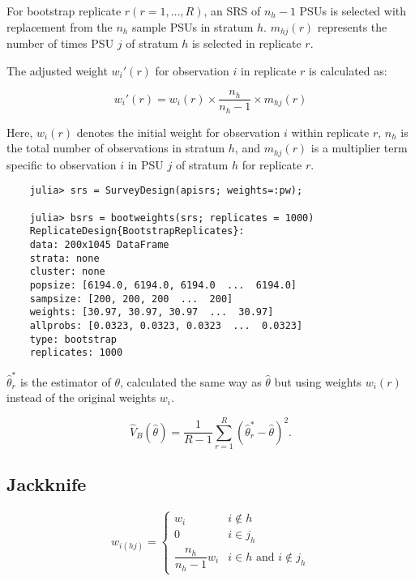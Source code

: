 \documentclass{juliacon}
\begin{document}
For bootstrap replicate $r (r = 1, \dots, R)$, an SRS of $n_h - 1$ PSUs is selected with replacement from the $n_h$ sample PSUs in stratum $h$. $m_{hj}(r)$ represents the number of times PSU $j$ of stratum $h$ is selected in replicate $r$.

The adjusted weight $w_i'(r)$ for observation $i$ in replicate $r$ is calculated as:

\begin{equation}
    w_i'(r) = w_i(r) \times \frac{n_h}{n_h - 1} \times m_{hj}(r)
\end{equation}

Here, $w_i(r)$ denotes the initial weight for observation $i$ within replicate $r$, $n_h$ is the total number of observations in stratum $h$, and $m_{hj}(r)$ is a multiplier term specific to observation $i$ in PSU $j$ of stratum $h$ for replicate $r$.

\begin{lstlisting}
    julia> srs = SurveyDesign(apisrs; weights=:pw);
    
    julia> bsrs = bootweights(srs; replicates = 1000)
    ReplicateDesign{BootstrapReplicates}:
    data: 200x1045 DataFrame
    strata: none
    cluster: none
    popsize: [6194.0, 6194.0, 6194.0  ...  6194.0]
    sampsize: [200, 200, 200  ...  200]
    weights: [30.97, 30.97, 30.97  ...  30.97]
    allprobs: [0.0323, 0.0323, 0.0323  ...  0.0323]
    type: bootstrap
    replicates: 1000
\end{lstlisting}

$\hat{\theta}^*_r$ is the estimator of $\theta$, calculated the same way as $\hat{\theta}$ but using weights $w_i(r)$ instead of the original weights $w_i$. 

\begin{equation}
        \hat{V}_B(\hat{\theta}) = \dfrac{1}{R-1}\sum_{r=1}^{R} (\hat{\theta}^*_r - \hat{\theta})^2.
\end{equation}



\subsection{Jackknife}

\begin{equation*}
    w_{i(hj)} = \begin{cases}
        w_i & i \notin h\\
    0 & i \in j_{h} \\
    \dfrac{n_h}{n_h - 1} w_i &  i \in h \text{ and } i \notin j_{h}
    \end{cases}
    \end{equation*}
\end{document}
